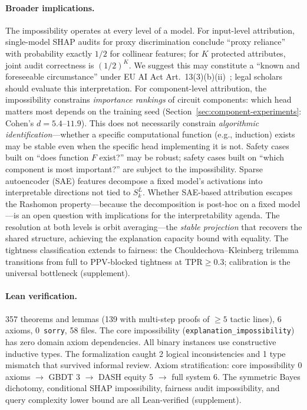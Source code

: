 \documentclass{article}
\begin{document}
\paragraph{Broader implications.}
The impossibility operates at every level of a model. For input-level attribution, single-model SHAP audits for proxy discrimination conclude ``proxy reliance'' with probability exactly $1/2$ for collinear features; for $K$ protected attributes, joint audit correctness is $(1/2)^K$. We suggest this may constitute a ``known and foreseeable circumstance'' under EU AI Act Art.~13(3)(b)(ii)~\citep{euaiact2024}; legal scholars should evaluate this interpretation.
For component-level attribution, the impossibility constrains \emph{importance rankings} of circuit components: which head matters most depends on the training seed (Section~\ref{sec:component-experiments}: Cohen's $d = 5.4$--$11.9$). This does not necessarily constrain \emph{algorithmic identification}---whether a specific computational function (e.g., induction) exists may be stable even when the specific head implementing it is not. Safety cases built on ``does function $F$ exist?'' may be robust; safety cases built on ``which component is most important?'' are subject to the impossibility.
Sparse autoencoder (SAE) features decompose a fixed model's activations into interpretable directions not tied to $S_k^L$. Whether SAE-based attribution escapes the Rashomon property---because the decomposition is post-hoc on a fixed model---is an open question with implications for the interpretability agenda.
The resolution at both levels is orbit averaging---the \emph{stable projection} that recovers the shared structure, achieving the explanation capacity bound with equality.
The tightness classification extends to fairness: the Chouldechova--Kleinberg trilemma transitions from full to PPV-blocked tightness at $\text{TPR} \geq 0.3$; calibration is the universal bottleneck (supplement).

\paragraph{Lean verification.}
357 theorems and lemmas (139 with multi-step proofs of ${\geq}5$ tactic lines), 6 axioms, 0~\texttt{sorry}, 58 files. The core impossibility (\texttt{explanation\_impossibility}) has zero domain axiom dependencies. All binary instances use constructive inductive types. The formalization caught 2 logical inconsistencies and 1 type mismatch that survived informal review. Axiom stratification: core impossibility 0 axioms $\to$ GBDT 3 $\to$ DASH equity 5 $\to$ full system 6. The symmetric Bayes dichotomy, conditional SHAP impossibility, fairness audit impossibility, and query complexity lower bound are all Lean-verified (supplement).
\end{document}
